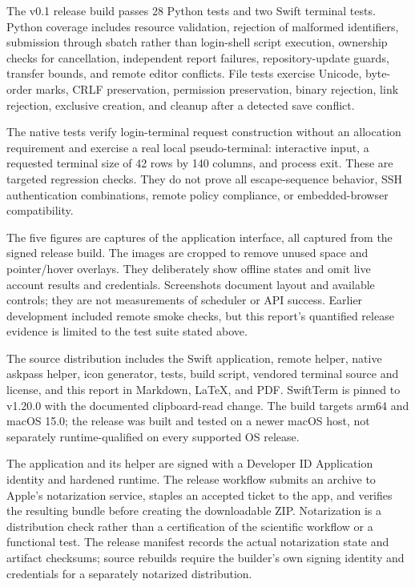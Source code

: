 \documentclass[manuscript,screen,nonacm]{acmart}
\begin{document}
The v0.1 release build passes 28 Python tests and two Swift terminal tests. Python coverage includes resource validation, rejection of malformed identifiers, submission through sbatch rather than login-shell script execution, ownership checks for cancellation, independent report failures, repository-update guards, transfer bounds, and remote editor conflicts. File tests exercise Unicode, byte-order marks, CRLF preservation, permission preservation, binary rejection, link rejection, exclusive creation, and cleanup after a detected save conflict.

The native tests verify login-terminal request construction without an allocation requirement and exercise a real local pseudo-terminal: interactive input, a requested terminal size of 42 rows by 140 columns, and process exit. These are targeted regression checks. They do not prove all escape-sequence behavior, SSH authentication combinations, remote policy compliance, or embedded-browser compatibility.

The five figures are captures of the application interface, all captured from the signed release build. The images are cropped to remove unused space and pointer/hover overlays. They deliberately show offline states and omit live account results and credentials. Screenshots document layout and available controls; they are not measurements of scheduler or API success. Earlier development included remote smoke checks, but this report's quantified release evidence is limited to the test suite stated above.

The source distribution includes the Swift application, remote helper, native askpass helper, icon generator, tests, build script, vendored terminal source and license, and this report in Markdown, LaTeX, and PDF. SwiftTerm is pinned to v1.20.0 with the documented clipboard-read change. The build targets arm64 and macOS 15.0; the release was built and tested on a newer macOS host, not separately runtime-qualified on every supported OS release.

The application and its helper are signed with a Developer ID Application identity and hardened runtime. The release workflow submits an archive to Apple's notarization service, staples an accepted ticket to the app, and verifies the resulting bundle before creating the downloadable ZIP. Notarization is a distribution check rather than a certification of the scientific workflow or a functional test. The release manifest records the actual notarization state and artifact checksums; source rebuilds require the builder's own signing identity and credentials for a separately notarized distribution.
\end{document}
